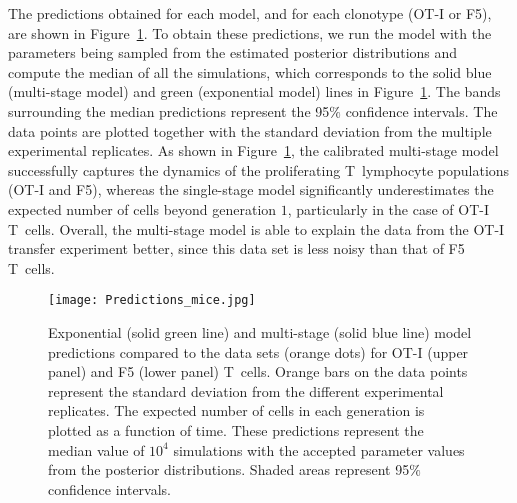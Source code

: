 \documentclass[10pt]{article}
\numberwithin{equation}{section}
\begin{document}
The predictions obtained for each model, and for each clonotype (OT-I or
F5), are shown in Figure~\ref{pred_murine}. To obtain these predictions, we run the model with the parameters being sampled from the estimated posterior distributions and compute the median of all the simulations, which corresponds to the solid blue (multi-stage model) and green (exponential model) lines in Figure~\ref{pred_murine}. The bands surrounding the median predictions represent the 95$\%$ confidence intervals. The data points are plotted together with the standard deviation from the multiple experimental replicates. As shown in Figure~\ref{pred_murine}, the calibrated multi-stage model successfully captures the dynamics of the proliferating T~lymphocyte populations (OT-I and F5), whereas the single-stage model significantly underestimates the expected number of cells beyond generation $1$, particularly in the case of OT-I T~cells. Overall, the multi-stage model is able to explain the data from the OT-I transfer
experiment better, since this data set is less noisy than that of F5 T~cells. 

\begin{figure}[htp!]
    \centering
    \texttt{[image: Predictions\_mice.jpg]}
    \caption{Exponential (solid green line) and multi-stage 
    (solid blue line)
    model predictions compared to the data sets (orange dots) for OT-I (upper panel) and F5 (lower panel) T~cells.
     Orange bars on the data points represent the standard deviation from the different  experimental replicates.
    The expected number of cells in each generation is plotted as a function of time. These predictions represent the median value of $10^4$ simulations with the accepted parameter values from the posterior distributions. Shaded areas represent 95$\%$ confidence intervals.}
    \label{pred_murine}
\end{figure}

\begin{comment}

\begin{table}
    \centering
    \begin{tabular}{|c|c|c|}
    \hline
        Mathematical model & Cell type & Value of AIC$_C$ \\
        \hline
        Erlang & OT-I T cells & 50.4 \\ 
        \hline
        Exponential & OT-I T cells & 283 \\
        \hline
        Erlang & F5 T cells &  208 \\
        \hline
        Exponential & F5 T cells &  318 \\
     \hline
    \end{tabular}
    \caption{AIC$_C$ values for the exponential and multi-stage models calibrated with CFSE data of murine T lymphocytes.}
    \label{AIC_C_values}
\end{table}
\end{comment}
\end{document}
